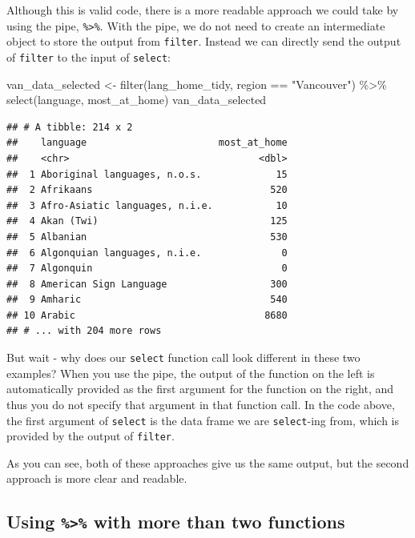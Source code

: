 \documentclass[
]{krantz}
\makeatletter
\newenvironment{Shaded}{\begin{snugshade}}{\end{snugshade}}
\newcommand{\FunctionTok}[1]{\textcolor[rgb]{0,0,0}{#1}}
\newcommand{\NormalTok}[1]{#1}
\newcommand{\OtherTok}[1]{\textcolor[rgb]{0.37,0.37,0.37}{#1}}
\newcommand{\SpecialCharTok}[1]{\textcolor[rgb]{0,0,0}{#1}}
\newcommand{\StringTok}[1]{\textcolor[rgb]{0.5,0.5,0.5}{#1}}
\newenvironment{kframe}{%
\medskip{}
\setlength{\fboxsep}{.8em}
 \def\at@end@of@kframe{}%
 \ifinner\ifhmode%
  \def\at@end@of@kframe{\end{minipage}}%
  \begin{minipage}{\columnwidth}%
 \fi\fi%
 \def\FrameCommand##1{\hskip\@totalleftmargin \hskip-\fboxsep
 \colorbox{shadecolor}{##1}\hskip-\fboxsep
     \hskip-\linewidth \hskip-\@totalleftmargin \hskip\columnwidth}%
 \MakeFramed {\advance\hsize-\width
   \@totalleftmargin\z@ \linewidth\hsize
   \@setminipage}}%
 {\par\unskip\endMakeFramed%
 \at@end@of@kframe}
\renewenvironment{Shaded}{\begin{kframe}}{\end{kframe}}
\makeatother
\begin{document}
Although this is valid code, there is a more readable approach we could take by using the pipe, \texttt{\%\textgreater{}\%}. With the pipe, we do not need to create an intermediate object to store the output from \texttt{filter}. Instead we can directly send the
output of \texttt{filter} to the input of \texttt{select}:

\begin{Shaded}
\begin{Highlighting}[]
\NormalTok{van\_data\_selected }\OtherTok{\textless{}{-}} \FunctionTok{filter}\NormalTok{(lang\_home\_tidy, region }\SpecialCharTok{==} \StringTok{"Vancouver"}\NormalTok{) }\SpecialCharTok{\%\textgreater{}\%}
  \FunctionTok{select}\NormalTok{(language, most\_at\_home)}
\NormalTok{van\_data\_selected}
\end{Highlighting}
\end{Shaded}

\begin{verbatim}
## # A tibble: 214 x 2
##    language                       most_at_home
##    <chr>                                 <dbl>
##  1 Aboriginal languages, n.o.s.             15
##  2 Afrikaans                               520
##  3 Afro-Asiatic languages, n.i.e.           10
##  4 Akan (Twi)                              125
##  5 Albanian                                530
##  6 Algonquian languages, n.i.e.              0
##  7 Algonquin                                 0
##  8 American Sign Language                  300
##  9 Amharic                                 540
## 10 Arabic                                 8680
## # ... with 204 more rows
\end{verbatim}

But wait - why does our \texttt{select} function call look different in these two examples? When you use the pipe,
the output of the function on the left is automatically provided as the first argument for the function on the right, and thus you do not specify that argument in that function call. In the code above, the first
argument of \texttt{select} is the data frame we are \texttt{select}-ing from, which is provided by the output of \texttt{filter}.

As you can see, both of these approaches give us the same output, but the second approach is more clear and readable.

\hypertarget{using-with-more-than-two-functions}{%
\subsection{\texorpdfstring{Using \texttt{\%\textgreater{}\%} with more than two functions}{Using \%\textgreater\% with more than two functions}}\label{using-with-more-than-two-functions}}
\end{document}
